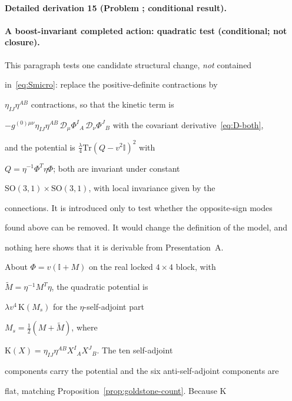 \paragraph{Detailed derivation 15 (Problem ; conditional result).} \label{ref:detail-14} %



\paragraph{A boost-invariant completed action: quadratic test (conditional; not closure).}

This paragraph tests one candidate structural change, \emph{not} contained

in~\eqref{eq:Smicro}: replace the positive-definite contractions by

\(\eta_{IJ}\eta^{AB}\) contractions, so that the kinetic term is

\(-g^{(0)\mu\nu}\eta_{IJ}\eta^{AB}\,\mathcal{D}_\mu\Phi^I{}_A\,

\mathcal{D}_\nu\Phi^J{}_B\) with the covariant derivative~\eqref{eq:D-both},

and the potential is \(\tfrac{\lambda}{4}\mathrm{Tr}(Q-v^2\mathbb{I})^2\) with

\(Q=\eta^{-1}\Phi^{T}\eta\Phi\); both are invariant under constant

\(\mathrm{SO}(3,1)\times\mathrm{SO}(3,1)\), with local invariance given by the

connections. It is introduced only to test whether the opposite-sign modes

found above can be removed. It would change the definition of the model, and

nothing here shows that it is derivable from Presentation~A.



About \(\Phi=v(\mathbb{I}+M)\) on the real locked \(4\times4\) block, with

\(\tilde M=\eta^{-1}M^{T}\eta\), the quadratic potential is

\(\lambda v^{4}\,\mathrm{K}(M_s)\) for the \(\eta\)-self-adjoint part

\(M_s=\tfrac12(M+\tilde M)\), where

\(\mathrm{K}(X)=\eta_{IJ}\eta^{AB}X^I{}_AX^J{}_B\). The ten self-adjoint

components carry the potential and the six anti-self-adjoint components are

flat, matching Proposition~\ref{prop:goldstone-count}. Because \(\mathrm{K}\)

